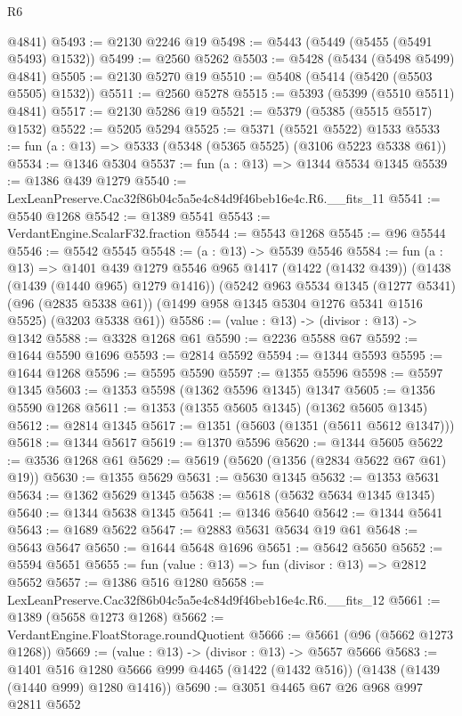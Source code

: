 \begin{lexlean}{R6}
\begin{coremodule}
      @4841)
@5493 := @2130 @2246 @19
@5498 := @5443 (@5449 (@5455 (@5491 @5493) @1532))
@5499 := @2560 @5262
@5503 := @5428 (@5434 (@5498 @5499) @4841)
@5505 := @2130 @5270 @19
@5510 := @5408 (@5414 (@5420 (@5503 @5505) @1532))
@5511 := @2560 @5278
@5515 := @5393 (@5399 (@5510 @5511) @4841)
@5517 := @2130 @5286 @19
@5521 := @5379 (@5385 (@5515 @5517) @1532)
@5522 := @5205 @5294
@5525 := @5371 (@5521 @5522) @1533
@5533 := fun (a : @13) => @5333 (@5348 (@5365 @5525) (@3106 @5223 @5338 @61))
@5534 := @1346 @5304
@5537 := fun (a : @13) => @1344 @5534 @1345
@5539 := @1386 @439 @1279
@5540 := LexLeanPreserve.Cac32f86b04c5a5e4c84d9f46beb16e4c.R6.__fits_11
@5541 := @5540 @1268
@5542 := @1389 @5541
@5543 := VerdantEngine.ScalarF32.fraction
@5544 := @5543 @1268
@5545 := @96 @5544
@5546 := @5542 @5545
@5548 := (a : @13) -> @5539 @5546
@5584 := fun (a : @13) =>
  @1401
    @439
    @1279
    @5546
    @965
    @1417
    (@1422 (@1432 @439))
    (@1438 (@1439 (@1440 @965) @1279 @1416))
    (@5242
      @963
      @5534
      @1345
      (@1277 @5341)
      (@96 (@2835 @5338 @61))
      (@1499 @958 @1345 @5304 @1276 @5341 @1516 @5525)
      (@3203 @5338 @61))
@5586 := (value : @13) -> (divisor : @13) -> @1342
@5588 := @3328 @1268 @61
@5590 := @2236 @5588 @67
@5592 := @1644 @5590 @1696
@5593 := @2814 @5592
@5594 := @1344 @5593
@5595 := @1644 @1268
@5596 := @5595 @5590
@5597 := @1355 @5596
@5598 := @5597 @1345
@5603 := @1353 @5598 (@1362 @5596 @1345) @1347
@5605 := @1356 @5590 @1268
@5611 := @1353 (@1355 @5605 @1345) (@1362 @5605 @1345)
@5612 := @2814 @1345
@5617 := @1351 (@5603 (@1351 (@5611 @5612 @1347)))
@5618 := @1344 @5617
@5619 := @1370 @5596
@5620 := @1344 @5605
@5622 := @3536 @1268 @61
@5629 := @5619 (@5620 (@1356 (@2834 @5622 @67 @61) @19))
@5630 := @1355 @5629
@5631 := @5630 @1345
@5632 := @1353 @5631
@5634 := @1362 @5629 @1345
@5638 := @5618 (@5632 @5634 @1345 @1345)
@5640 := @1344 @5638 @1345
@5641 := @1346 @5640
@5642 := @1344 @5641
@5643 := @1689 @5622
@5647 := @2883 @5631 @5634 @19 @61
@5648 := @5643 @5647
@5650 := @1644 @5648 @1696
@5651 := @5642 @5650
@5652 := @5594 @5651
@5655 := fun (value : @13) => fun (divisor : @13) => @2812 @5652
@5657 := @1386 @516 @1280
@5658 := LexLeanPreserve.Cac32f86b04c5a5e4c84d9f46beb16e4c.R6.__fits_12
@5661 := @1389 (@5658 @1273 @1268)
@5662 := VerdantEngine.FloatStorage.roundQuotient
@5666 := @5661 (@96 (@5662 @1273 @1268))
@5669 := (value : @13) -> (divisor : @13) -> @5657 @5666
@5683 := @1401
    @516
    @1280
    @5666
    @999
    @4465
    (@1422 (@1432 @516))
    (@1438 (@1439 (@1440 @999) @1280 @1416))
@5690 := @3051 @4465 @67 @26 @968 @997 @2811 @5652

\end{coremodule}
\end{lexlean}
